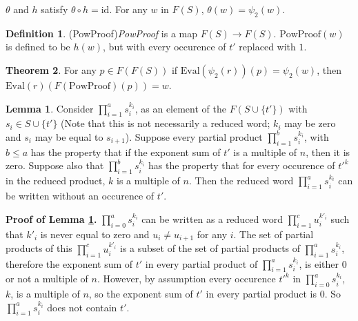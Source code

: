 \documentclass[11pt]{article} %
\theoremstyle{definition}
\newtheorem{theorem}{Theorem}[section]
\theoremstyle{definition}
\theoremstyle{definition}
\theoremstyle{definition}
\newtheorem{sublemma}{Lemma}[theorem]
\theoremstyle{definition}
\newtheorem{defn}[theorem]{Definition}
\theoremstyle{definition}
\begin{document}
$\theta$ and $h$ satisfy $\theta \circ h = \text{id}$. For any $w$ in $F(S)$,
$\theta(w) = \psi_2(w)$.

\begin{defn}(PowProof)\label{PowProof}
  \textit{PowProof} is a map $F(S) \to F(S)$. $\text{PowProof}(w)$ is defined to be
  $h(w)$, but with every occurence of $t'$ replaced with $1$.
\end{defn}

\begin{theorem}\label{powproof}
  For any $p \in F(F(S))$ if \newline $\text{Eval}(\psi_2(r))(p) = \psi_2(w)$,
  then $\text{Eval}(r)(F(\text{PowProof})(p)) = w$.
\end{theorem}

\begin{sublemma}\label{powproof1}
  Consider $\prod_{i = 1}^a s_i^{k_i}$, as an element of the $F(S \cup \{t'\})$
  with $s_i \in S \cup \{t'\}$ (Note that this is not necessarily a reduced
  word; $k_i$ may be zero and $s_i$ may be equal to $s_{i+1}$).
  Suppose every partial product $\prod_{i=1}^b s_i^{k_i}$,
  with $b \le a$ has the property that if the exponent sum of $t'$ is a multiple
  of $n$, then it is zero. Suppose also that $\prod_{i = 1}^b s_i^{k_i}$ has the
  property that for every occurence of $t'^k$ in the reduced product, $k$ is a multiple of
  $n$. Then the reduced word $\prod_{i = 1}^a s_i^{k_i}$
  can be written without an occurence of $t'$.
\end{sublemma}

\textbf{Proof of Lemma \ref{powproof1}.} $\prod_{i=0}^a s_i^{k_i}$ can be written as a reduced
word $\prod_{i = 1}^{c} u_i^{k'_i}$ such that $k'_i$ is never equal to zero and
$u_i \ne u_{i+1}$ for any $i$. The set of partial products of this
$\prod_{i = 1}^{c} u_i^{k'_i}$ is a subset of the set of partial products of $\prod_{i=1}^a s_i^{k_i}$,
therefore the exponent sum of $t'$ in every partial product of $\prod_{i=1}^a s_i^{k_i}$, is
either $0$ or not a multiple of $n$. However, by assumption every occurence $t'^k$ in
$\prod_{i=0}^a s_i^{k_i}$, $k$, is a multiple of $n$, so the exponent sum of $t'$ in every
partial product is $0$. So $\prod_{i=1}^a s_i^{k_i}$ does not contain $t'$.
\end{document}
